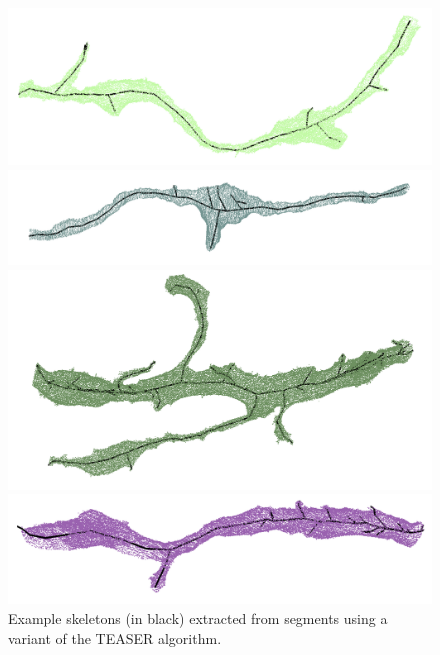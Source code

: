 
\begin{figure}[t]
	\centering
	\begin{minipage}{0.45\linewidth}
		\includegraphics[width=\linewidth]{./figures/skeleton1.png}		
	\end{minipage}
	\hfill
	\begin{minipage}{0.45\linewidth}
		\includegraphics[width=\linewidth]{./figures/skeleton2.png}		
	\end{minipage}
	\begin{minipage}{0.45\linewidth}
		\includegraphics[width=\linewidth]{./figures/skeleton3.png}		
	\end{minipage}
	\hfill
	\begin{minipage}{0.45\linewidth}
		\includegraphics[width=\linewidth]{./figures/skeleton4.png}		
	\end{minipage}
	\caption{Example skeletons (in black) extracted from segments using a variant of the TEASER algorithm.}
	\label{fig:skeletonization}
\end{figure}

